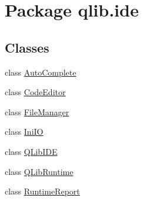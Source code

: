 \hypertarget{namespaceqlib_1_1ide}{}\section{Package qlib.\+ide}
\label{namespaceqlib_1_1ide}
\subsection*{Classes}
\begin{DoxyCompactItemize}
\item 
class \hyperlink{classqlib_1_1ide_1_1AutoComplete}{Auto\+Complete}
\item 
class \hyperlink{classqlib_1_1ide_1_1CodeEditor}{Code\+Editor}
\item 
class \hyperlink{classqlib_1_1ide_1_1FileManager}{File\+Manager}
\item 
class \hyperlink{classqlib_1_1ide_1_1IniIO}{Ini\+IO}
\item 
class \hyperlink{classqlib_1_1ide_1_1QLibIDE}{Q\+Lib\+I\+DE}
\item 
class \hyperlink{classqlib_1_1ide_1_1QLibRuntime}{Q\+Lib\+Runtime}
\item 
class \hyperlink{classqlib_1_1ide_1_1RuntimeReport}{Runtime\+Report}
\end{DoxyCompactItemize}
